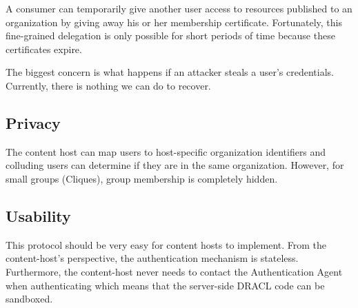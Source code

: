 \documentclass[pdftex,12pt,a4papaer]{article}
\begin{document}
A consumer can temporarily give another user access to resources published to an
organization by giving away his or her membership certificate. Fortunately, this
fine-grained delegation is only possible for short periods of time because these
certificates expire.

The biggest concern is what happens if an attacker steals a user's credentials.
Currently, there is nothing we can do to recover.

\subsection{Privacy}

The content host can map users to host-specific organization identifiers and
colluding users can determine if they are in the same organization. However, for
small groups (Cliques), group membership is completely hidden.

\subsection{Usability}

This protocol should be very easy for content hosts to implement. From the
content-host's perspective, the authentication mechanism is stateless.
Furthermore, the content-host never needs to contact the Authentication Agent
when authenticating which means that the server-side DRACL code can be
sandboxed.


%
%
%
%
%
%
%
%
%
%
%
%
%



\end{document}
